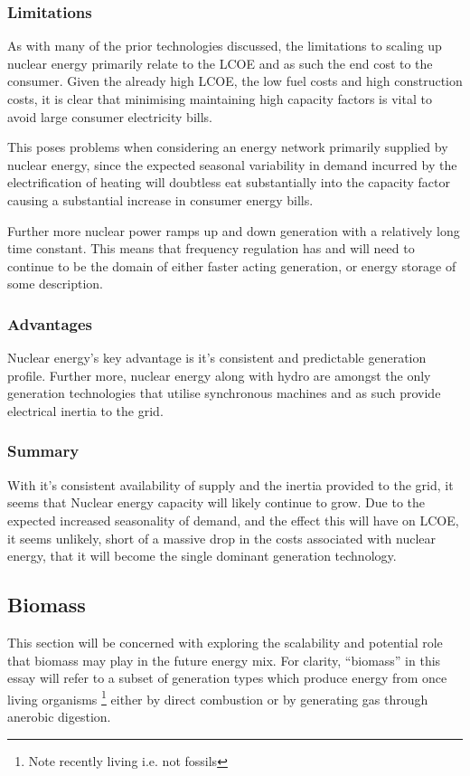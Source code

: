 \documentclass[11pt]{article}
\numberwithin{equation}{section}
\begin{document}
\subsubsection{Limitations}
\label{sec:org706fdc8}
As with many of the prior technologies discussed, the limitations to scaling up nuclear energy primarily relate to the LCOE and as such the end cost to the consumer.  Given the already high LCOE, the low fuel costs and high construction costs, it is clear that minimising maintaining high capacity factors is vital to avoid large consumer electricity bills.

This poses problems when considering an energy network primarily supplied by nuclear energy, since the expected seasonal variability in demand incurred by the electrification of heating will doubtless eat substantially into the capacity factor causing a substantial increase in consumer energy bills.

Further more nuclear power ramps up and down generation with a relatively long time constant. This means that frequency regulation has and will need to continue to be the domain of either faster acting generation, or energy storage of some description.

\subsubsection{Advantages}
\label{sec:org911e931}
Nuclear energy's key advantage is it's consistent and predictable generation profile. Further more, nuclear energy along with hydro are amongst the only generation technologies that utilise synchronous machines and as such provide electrical inertia to the grid.

\subsubsection{Summary}
\label{sec:orga3ac6b6}
With it's consistent availability of supply and the inertia provided to the grid, it seems that Nuclear energy capacity will likely continue to grow. Due to the expected increased seasonality of demand, and the effect this will have on LCOE, it seems unlikely, short of a massive drop in the costs associated with nuclear energy, that it will become the single dominant generation technology.

\subsection{Biomass \label{secBioGas}}
\label{sec:org4a919ee}
This section will be concerned with exploring the scalability and potential role that biomass may play in the future energy mix. For clarity, ``biomass'' in this essay will refer to a subset of generation types which produce energy from once living organisms \footnote{Note recently living i.e. not fossils} either by direct combustion or by generating gas through anerobic digestion.
\end{document}
